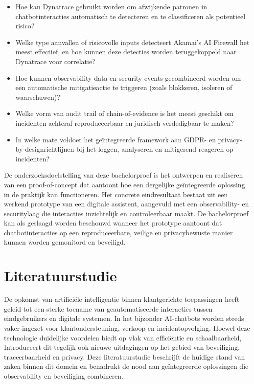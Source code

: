 \begin{itemize}
    \item Hoe kan Dynatrace gebruikt worden om afwijkende patronen in chatbotinteracties automatisch te detecteren en te classificeren als potentieel risico?
    \item Welke type aanvallen of risicovolle inputs detecteert Akamai’s AI Firewall het meest effectief, en hoe kunnen deze detecties worden teruggekoppeld naar Dynatrace voor correlatie?
    \item Hoe kunnen observability-data en security-events gecombineerd worden om een automatische mitigatieactie te triggeren (zoals blokkeren, isoleren of waarschuwen)?
    \item Welke vorm van audit trail of chain-of-evidence is het meest geschikt om incidenten achteraf reproduceerbaar en juridisch verdedigbaar te maken?
    \item In welke mate voldoet het geïntegreerde framework aan GDPR- en privacy-by-designrichtlijnen bij het loggen, analyseren en mitigerend reageren op incidenten?
\end{itemize}

\noindent De onderzoeksdoelstelling van deze bachelorproef is het ontwerpen en realiseren van een proof-of-concept dat aantoont hoe een dergelijke geïntegreerde oplossing in de praktijk kan functioneren. Het concrete eindresultaat bestaat uit een werkend prototype van een digitale assistent, aangevuld met een observability- en securitylaag die interacties inzichtelijk en controleerbaar maakt. De bachelorproef kan als geslaagd worden beschouwd wanneer het prototype aantoont dat chatbotinteracties op een reproduceerbare, veilige en privacybewuste manier kunnen worden gemonitord en beveiligd.\\


\section{Literatuurstudie}%
\label{sec:literatuurstudie}

\noindent De opkomst van artificiële intelligentie binnen klantgerichte toepassingen heeft geleid tot een sterke toename van geautomatiseerde interacties tussen eindgebruikers en digitale systemen. In het bijzonder AI-chatbots worden steeds vaker ingezet voor klantondersteuning, verkoop en incidentopvolging. Hoewel deze technologie duidelijke voordelen biedt op vlak van efficiëntie en schaalbaarheid, Introduceert dit tegelijk ook nieuwe uitdagingen op het gebied van beveiliging, traceerbaarheid en privacy. Deze literatuurstudie beschrijft de huidige stand van zaken binnen dit domein en benadrukt de nood aan geïntegreerde oplossingen die observability en beveiliging combineren.

